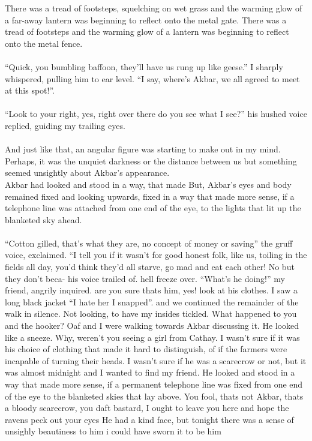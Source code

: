 \documentclass{book}
\begin{document}
{{%
There was a tread of footsteps, squelching on wet grass
and the warming glow of a far-away lantern was beginning to reflect
onto the metal gate.
There was a tread of footsteps and the warming glow
of a lantern was beginning to reflect onto the metal fence.\\\\
``Quick, you bumbling baffoon, they'll have us rung up like geese.''
I sharply whispered, pulling him to ear level.
``I say, where's Akbar, we all agreed to meet
at this spot!''.\\\\
``Look to your right, yes, right over there do you see
what I see?'' his hushed voice replied, guiding my trailing eyes.\\\\
And just like that, an angular figure was starting to make out in my mind.
Perhaps, it was the unquiet darkness or the distance between us but
something seemed unsightly about Akbar's appearance.\\
Akbar had looked and stood in a way, that made
But, Akbar's eyes and body remained fixed and looking upwards, fixed in a way that
made more sense, if a telephone line was attached from one end of
the eye, to the lights that lit up the blanketed sky ahead.\\\\
``Cotton gilled, that's what they are, no concept
of money or saving'' the gruff voice, exclaimed. ``I tell
you if it wasn't for good honest folk, like us, toiling in the fields
all day, you'd think they'd all starve, go mad and eat each other! No but
they don't beca- his voice trailed of.
hell freeze over.
``What's he doing!'' my friend, angrily inquired.
are you sure thats him, yes! look at his clothes.
I saw a long black jacket
``I hate her I snapped''.
and we continued the remainder of the walk in silence.
Not looking, to have my insides tickled.
What happened to you and the hooker?
Oaf and I were walking towards Akbar discussing it.
He looked like a sneeze.
Why, weren't you seeing a girl from Cathay.
I wasn't sure if it was his choice of clothing
that made it hard to distinguish, of if the farmers
were incapable of turning their heads.
I wasn't sure if he was a scarecrow or not, but it was
almost midnight and I wanted to find my friend.
He looked and stood in a way that made more sense,
 if a permanent telephone line was fixed from one end of the eye to the blanketed
 skies that lay above.
 You fool, thats not Akbar, thats a bloody scarecrow, you daft
 bastard, I ought to leave you here and hope the ravens peck out your eyes
 He had a kind face, but tonight there was a sense of unsighly beautiness to him
 i could have sworn it to be him
}
}
\end{document}
